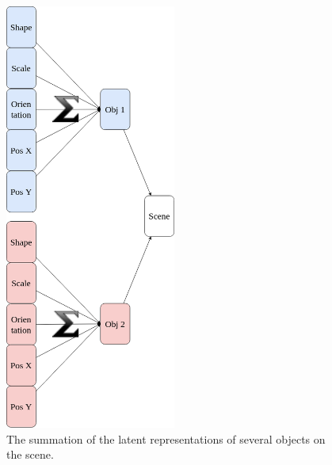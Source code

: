 \documentclass{article}
\begin{document}
\begin{figure}[ht]
\begin{minipage}[t]{0.48\textwidth}
            \includegraphics[width=0.5\textwidth]{img/model/multiple_objects_on_scene}
            \caption{The summation of the latent representations of several objects on the scene.}
            \label{fig:multiple_objects_on_scene}
        \end{minipage}
    \end{figure}
\end{document}

